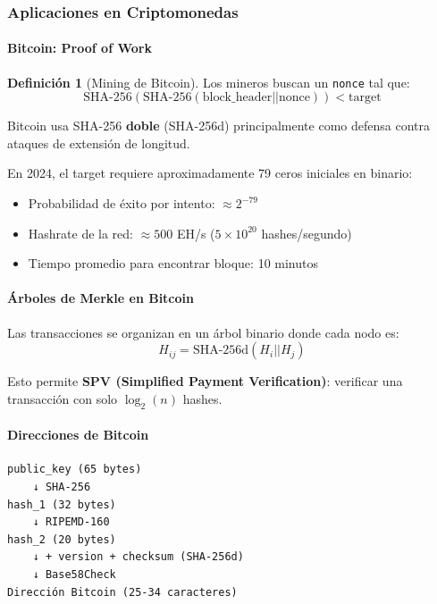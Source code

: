 \documentclass[11pt,a4paper,twoside,openright]{book}
\theoremstyle{definition}
\newtheorem{definition}{Definición}[chapter]
\theoremstyle{plain}
\theoremstyle{remark}
\begin{document}
\subsubsection{Aplicaciones en Criptomonedas}

\paragraph{Bitcoin: Proof of Work}

\begin{definition}[Mining de Bitcoin]
Los mineros buscan un \texttt{nonce} tal que:
\[ \text{SHA-256}(\text{SHA-256}(\text{block\_header} || \text{nonce})) < \text{target} \]
\end{definition}

\begin{intuicion}
Bitcoin usa SHA-256 \textbf{doble} (SHA-256d) principalmente como defensa contra ataques de extensión de longitud.
\end{intuicion}

\begin{ejemplo}
En 2024, el target requiere aproximadamente 79 ceros iniciales en binario:
\begin{itemize}
    \item Probabilidad de éxito por intento: $\approx 2^{-79}$
    \item Hashrate de la red: $\approx 500$ EH/s ($5 \times 10^{20}$ hashes/segundo)
    \item Tiempo promedio para encontrar bloque: 10 minutos
\end{itemize}
\end{ejemplo}

\paragraph{Árboles de Merkle en Bitcoin}

Las transacciones se organizan en un árbol binario donde cada nodo es:
\[ H_{ij} = \text{SHA-256d}(H_i || H_j) \]

Esto permite \textbf{SPV (Simplified Payment Verification)}: verificar una transacción con solo $\log_2(n)$ hashes.

\paragraph{Direcciones de Bitcoin}

\begin{verbatim}
public_key (65 bytes)
    ↓ SHA-256
hash_1 (32 bytes)
    ↓ RIPEMD-160
hash_2 (20 bytes)
    ↓ + version + checksum (SHA-256d)
    ↓ Base58Check
Dirección Bitcoin (25-34 caracteres)
\end{verbatim}
\end{document}
